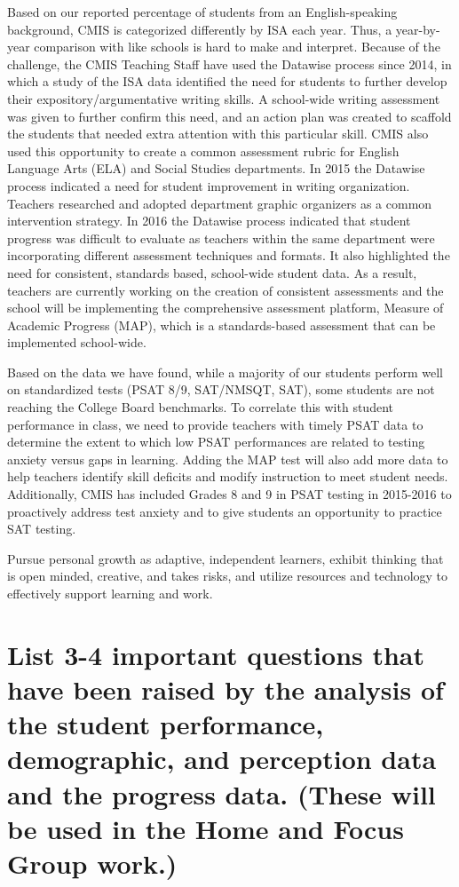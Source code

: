 Based on our reported percentage of students from an English-speaking background, CMIS is categorized differently by ISA each year.  Thus, a year-by-year comparison with like schools is hard to make and interpret. Because of the challenge, the CMIS Teaching Staff have used the Datawise process since 2014, in which a study of the ISA data identified the need for students to further develop their expository/argumentative writing skills.  A school-wide writing assessment was given to further confirm this need, and an action plan was created to scaffold the students that needed extra attention with this particular skill. CMIS also used this opportunity to create a common assessment rubric for English Language Arts (ELA) and Social Studies departments. In 2015 the Datawise process indicated a need for student improvement in writing organization. Teachers researched and adopted department graphic organizers as a common intervention strategy. In 2016 the Datawise process indicated that student progress was difficult to evaluate as teachers within the same department were incorporating different assessment techniques and formats. It also highlighted the need for consistent, standards based, school-wide student data. As a result, teachers are currently working on the creation of consistent assessments and the school will be implementing the comprehensive assessment platform, Measure of Academic Progress (MAP), which is a standards-based assessment that can be implemented school-wide.

Based on the data we have found, while a majority of our students perform well on standardized tests (PSAT 8/9, SAT/NMSQT, SAT), some students are not reaching the College Board benchmarks. To correlate this with student performance in class, we need to provide teachers with timely PSAT data to determine the extent to which low PSAT performances are related to testing anxiety versus gaps in learning. Adding the MAP test will also add more data to help teachers identify skill deficits and modify instruction to meet student needs. Additionally, CMIS has included Grades 8 and 9 in PSAT testing in 2015-2016 to proactively address test anxiety and to give students an opportunity to practice SAT testing. 


Pursue personal growth as adaptive, independent learners, exhibit thinking that is open minded, creative, and takes risks, and utilize resources and technology to effectively support learning and work.

\section{List 3-4 important questions that have been raised by the analysis of the student performance, demographic, and perception data and the progress data.  (These will be used in the Home and Focus Group work.)}

